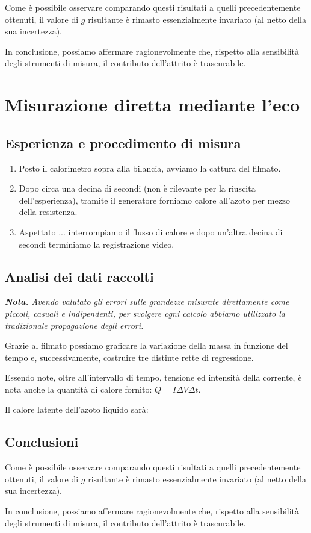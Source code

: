 \documentclass{article}
\begin{document}
Come è possibile osservare comparando questi risultati a
quelli precedentemente ottenuti, il valore di $g$ risultante
è rimasto essenzialmente invariato (al netto della sua incertezza).

In conclusione, possiamo affermare ragionevolmente che,
rispetto alla sensibilità degli strumenti di misura,
il contributo dell'attrito è trascurabile.

\section{Misurazione diretta mediante l'eco}

\subsection{Esperienza e procedimento di misura}

\begin{enumerate}
  \item
    Posto il calorimetro sopra alla bilancia, avviamo la cattura del filmato.
  \item
    Dopo circa una decina di secondi (non è rilevante per la riuscita dell'esperienza),
    tramite il generatore forniamo calore all'azoto per mezzo della resistenza.
  \item
    Aspettato ... interrompiamo il flusso di calore e dopo
    un'altra decina di secondi terminiamo la registrazione video.
\end{enumerate}

\subsection{Analisi dei dati raccolti}
\emph{\textbf{Nota.}
Avendo valutato gli errori sulle grandezze misurate direttamente
come piccoli, casuali e indipendenti, per svolgere ogni calcolo
abbiamo utilizzato la tradizionale propagazione degli errori.
}

  Grazie al filmato possiamo graficare la variazione della massa in funzione del tempo
  e, successivamente, costruire tre distinte rette di regressione.

  Essendo note, oltre all'intervallo di tempo, tensione ed intensità della corrente,
  è nota anche la quantità di calore fornito: $Q = I \Delta V \Delta t$.

  Il calore latente dell'azoto liquido sarà:

\subsection{Conclusioni}

Come è possibile osservare comparando questi risultati a
quelli precedentemente ottenuti, il valore di $g$ risultante
è rimasto essenzialmente invariato (al netto della sua incertezza).

In conclusione, possiamo affermare ragionevolmente che,
rispetto alla sensibilità degli strumenti di misura,
il contributo dell'attrito è trascurabile.
\end{document}

